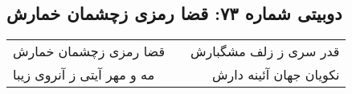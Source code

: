 \begin{center}
\section*{دوبیتی شماره ۷۳: قضا رمزی زچشمان خمارش}
\label{sec:073}
\begin{longtable}{l p{0.5cm} r}
قضا رمزی زچشمان خمارش
&&
قدر سری ز زلف مشگبارش
\\
مه و مهر آیتی ز آنروی زیبا
&&
نکویان جهان آئینه دارش
\\
\end{longtable}
\end{center}
